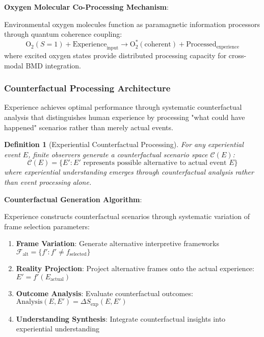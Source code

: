 \documentclass{article}
\newtheorem{definition}[theorem]{Definition}
\begin{document}
\textbf{Oxygen Molecular Co-Processing Mechanism}:

Environmental oxygen molecules function as paramagnetic information processors through quantum coherence coupling:
\begin{equation}
\text{O}_2(S=1) + \text{Experience}_{\text{input}} \rightarrow \text{O}_2^*(\text{coherent}) + \text{Processed}_{\text{experience}}
\end{equation}
where excited oxygen states provide distributed processing capacity for cross-modal BMD integration.

\subsubsection{Counterfactual Processing Architecture}

Experience achieves optimal performance through systematic counterfactual analysis that distinguishes human experience by processing "what could have happened" scenarios rather than merely actual events.

\begin{definition}[Experiential Counterfactual Processing]
For any experiential event $E$, finite observers generate a counterfactual scenario space $\mathcal{C}(E)$:
\begin{equation}
\mathcal{C}(E) = \{E' : E' \text{ represents possible alternative to actual event } E\}
\end{equation}
where experiential understanding emerges through counterfactual analysis rather than event processing alone.
\end{definition}

\textbf{Counterfactual Generation Algorithm}:

Experience constructs counterfactual scenarios through systematic variation of frame selection parameters:

\begin{enumerate}
\item \textbf{Frame Variation}: Generate alternative interpretive frameworks $\mathcal{F}_{\text{alt}} = \{f' : f' \neq f_{\text{selected}}\}$
\item \textbf{Reality Projection}: Project alternative frames onto the actual experience: $E' = f'(E_{\text{actual}})$
\item \textbf{Outcome Analysis}: Evaluate counterfactual outcomes: $\text{Analysis}(E, E') = \Delta S_{\text{exp}}(E, E')$
\item \textbf{Understanding Synthesis}: Integrate counterfactual insights into experiential understanding
\end{enumerate}
\end{document}
